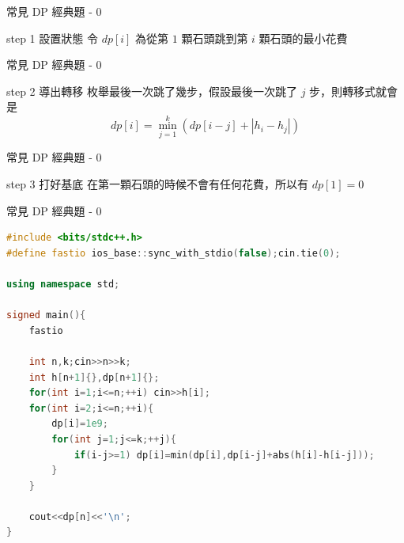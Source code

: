 \documentclass[aspectratio=169]{beamer}
\begin{document}
    \begin{frame}{常見 DP 經典題 - 0}
        \begin{alertblock}{step 1 設置狀態}
            令 $dp[i]$ 為從第 $1$ 顆石頭跳到第 $i$ 顆石頭的最小花費
        \end{alertblock}
    \end{frame}
    \begin{frame}{常見 DP 經典題 - 0}
        \begin{block}{step 2 導出轉移}
            枚舉最後一次跳了幾步，假設最後一次跳了 $j$ 步，則轉移式就會是
            $$dp[i] = \min_{j=1}^k(dp[i-j] + |h_i-h_j|)$$
        \end{block}
     \end{frame}  
     \begin{frame}{常見 DP 經典題 - 0}
        \begin{block}{step 3 打好基底}
            在第一顆石頭的時候不會有任何花費，所以有 $dp[1] = 0$
        \end{block}
    \end{frame}
    \begin{frame}[fragile]{常見 DP 經典題 - 0}
        \begin{lstlisting}[language=C++, basicstyle=\ttfamily\tiny]
#include <bits/stdc++.h>
#define fastio ios_base::sync_with_stdio(false);cin.tie(0);

using namespace std;

signed main(){
    fastio

    int n,k;cin>>n>>k;
    int h[n+1]{},dp[n+1]{};
    for(int i=1;i<=n;++i) cin>>h[i];
    for(int i=2;i<=n;++i){
        dp[i]=1e9;
        for(int j=1;j<=k;++j){
            if(i-j>=1) dp[i]=min(dp[i],dp[i-j]+abs(h[i]-h[i-j]));
        }
    }

    cout<<dp[n]<<'\n';
}
        \end{lstlisting}
    \end{frame}
\end{document}
